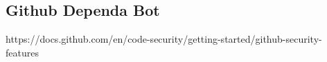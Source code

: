 \subsection{Github Dependa Bot} \label{sec:Dependa}
https://docs.github.com/en/code-security/getting-started/github-security-features